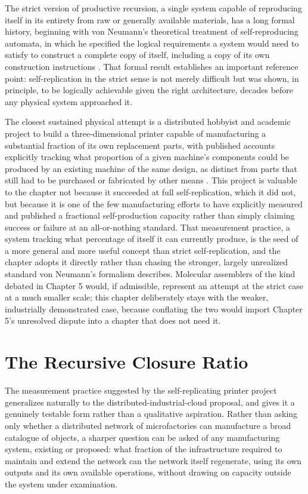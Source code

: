 \documentclass[11pt]{book}
\begin{document}
The strict version of productive recursion, a single system capable of reproducing itself in its entirety from raw or generally available materials, has a long formal history, beginning with von Neumann's theoretical treatment of self-reproducing automata, in which he specified the logical requirements a system would need to satisfy to construct a complete copy of itself, including a copy of its own construction instructions \cite{vonneumann1966}. That formal result establishes an important reference point: self-replication in the strict sense is not merely difficult but was shown, in principle, to be logically achievable given the right architecture, decades before any physical system approached it.

The closest sustained physical attempt is a distributed hobbyist and academic project to build a three-dimensional printer capable of manufacturing a substantial fraction of its own replacement parts, with published accounts explicitly tracking what proportion of a given machine's components could be produced by an existing machine of the same design, as distinct from parts that still had to be purchased or fabricated by other means \cite{jones2011}. This project is valuable to the chapter not because it succeeded at full self-replication, which it did not, but because it is one of the few manufacturing efforts to have explicitly measured and published a fractional self-production capacity rather than simply claiming success or failure at an all-or-nothing standard. That measurement practice, a system tracking what percentage of itself it can currently produce, is the seed of a more general and more useful concept than strict self-replication, and the chapter adopts it directly rather than chasing the stronger, largely unrealized standard von Neumann's formalism describes. Molecular assemblers of the kind debated in Chapter 5 would, if admissible, represent an attempt at the strict case at a much smaller scale; this chapter deliberately stays with the weaker, industrially demonstrated case, because conflating the two would import Chapter 5's unresolved dispute into a chapter that does not need it.

\section{The Recursive Closure Ratio}

The measurement practice suggested by the self-replicating printer project generalizes naturally to the distributed-industrial-cloud proposal, and gives it a genuinely testable form rather than a qualitative aspiration. Rather than asking only whether a distributed network of microfactories can manufacture a broad catalogue of objects, a sharper question can be asked of any manufacturing system, existing or proposed: what fraction of the infrastructure required to maintain and extend the network can the network itself regenerate, using its own outputs and its own available operations, without drawing on capacity outside the system under examination.
\end{document}
